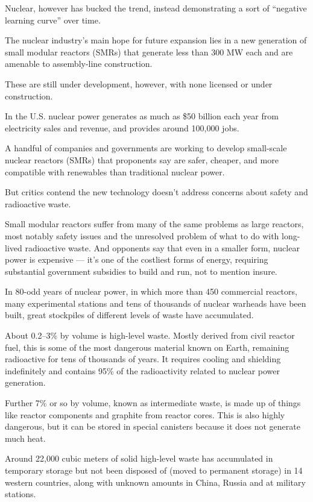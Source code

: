 \documentclass[
]{book}
\begin{document}
Nuclear, however has bucked the trend, instead demonstrating a sort of ``negative learning curve'' over time.

The nuclear industry's main hope for future expansion lies in a new generation of small modular reactors (SMRs) that generate less than 300 MW each and are amenable to assembly-line construction.

These are still under development, however, with none licensed or under construction.

In the U.S. nuclear power generates as much as \$50 billion each year from electricity sales and revenue, and provides around 100,000 jobs.

A handful of companies and governments are working to develop small-scale nuclear reactors (SMRs) that proponents say are safer, cheaper, and more compatible with renewables than traditional nuclear power.

But critics contend the new technology doesn't address concerns about safety and radioactive waste.

Small modular reactors suffer from many of the same problems as large reactors, most notably safety issues and the unresolved problem of what to do with long-lived radioactive waste. And opponents say that even in a smaller form, nuclear power is expensive --- it's one of the costliest forms of energy, requiring substantial government subsidies to build and run, not to mention insure.

In 80-odd years of nuclear power, in which more than 450 commercial reactors, many experimental stations and tens of thousands of nuclear warheads have been built, great stockpiles of different levels of waste have accumulated.

About 0.2--3\% by volume is high-level waste.
Mostly derived from civil reactor fuel, this is some of the most dangerous material known on Earth, remaining radioactive for tens of thousands of years. It requires cooling and shielding indefinitely and contains 95\% of the radioactivity related to nuclear power generation.

Further 7\% or so by volume, known as intermediate waste, is made up of things like reactor components and graphite from reactor cores. This is also highly dangerous, but it can be stored in special canisters because it does not generate much heat.

Around 22,000 cubic meters of solid high-level waste has accumulated in temporary storage but not been disposed of (moved to permanent storage) in 14 western countries, along with unknown amounts in China, Russia and at military stations.
\end{document}
